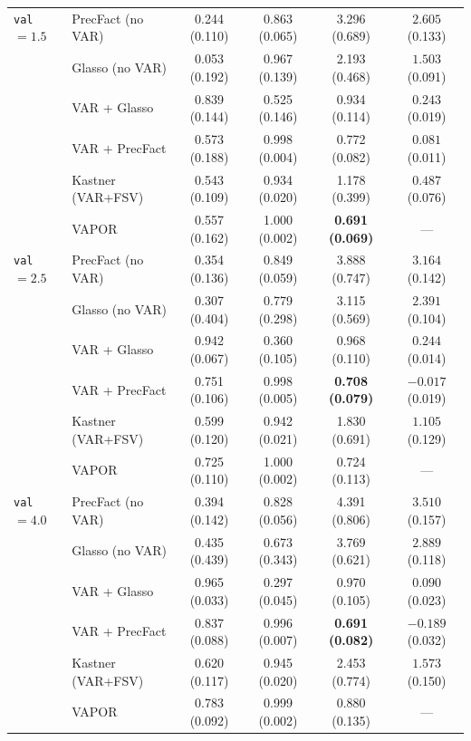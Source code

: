 \begin{table}[h!]
\begin{tabular}{llcccc}
\texttt{val} $= 1.5$ & PrecFact (no VAR)  & 0.244 (0.110) & 0.863 (0.065) & 3.296 (0.689) & $2.605$ (0.133) \\
                     & Glasso (no VAR)    & 0.053 (0.192) & 0.967 (0.139) & 2.193 (0.468) & $1.503$ (0.091) \\
                     & VAR + Glasso       & 0.839 (0.144) & 0.525 (0.146) & 0.934 (0.114) & $0.243$ (0.019) \\
                     & VAR + PrecFact     & 0.573 (0.188) & 0.998 (0.004) & 0.772 (0.082) & $0.081$ (0.011) \\
                     & Kastner (VAR+FSV)  & 0.543 (0.109) & 0.934 (0.020) & 1.178 (0.399) & $0.487$ (0.076) \\
                     & VAPOR              & 0.557 (0.162) & 1.000 (0.002) & \textbf{0.691 (0.069)} & --- \\
\midrule
\texttt{val} $= 2.5$ & PrecFact (no VAR)  & 0.354 (0.136) & 0.849 (0.059) & 3.888 (0.747) & $3.164$ (0.142) \\
                     & Glasso (no VAR)    & 0.307 (0.404) & 0.779 (0.298) & 3.115 (0.569) & $2.391$ (0.104) \\
                     & VAR + Glasso       & 0.942 (0.067) & 0.360 (0.105) & 0.968 (0.110) & $0.244$ (0.014) \\
                     & VAR + PrecFact     & 0.751 (0.106) & 0.998 (0.005) & \textbf{0.708 (0.079)} & $-0.017$ (0.019) \\
                     & Kastner (VAR+FSV)  & 0.599 (0.120) & 0.942 (0.021) & 1.830 (0.691) & $1.105$ (0.129) \\
                     & VAPOR              & 0.725 (0.110) & 1.000 (0.002) & 0.724 (0.113) & --- \\
\midrule
\texttt{val} $= 4.0$ & PrecFact (no VAR)  & 0.394 (0.142) & 0.828 (0.056) & 4.391 (0.806) & $3.510$ (0.157) \\
                     & Glasso (no VAR)    & 0.435 (0.439) & 0.673 (0.343) & 3.769 (0.621) & $2.889$ (0.118) \\
                     & VAR + Glasso       & 0.965 (0.033) & 0.297 (0.045) & 0.970 (0.105) & $0.090$ (0.023) \\
                     & VAR + PrecFact     & 0.837 (0.088) & 0.996 (0.007) & \textbf{0.691 (0.082)} & $-0.189$ (0.032) \\
                     & Kastner (VAR+FSV)  & 0.620 (0.117) & 0.945 (0.020) & 2.453 (0.774) & $1.573$ (0.150) \\
                     & VAPOR              & 0.783 (0.092) & 0.999 (0.002) & 0.880 (0.135) & --- \\
\bottomrule
\end{tabular}
\end{table}

